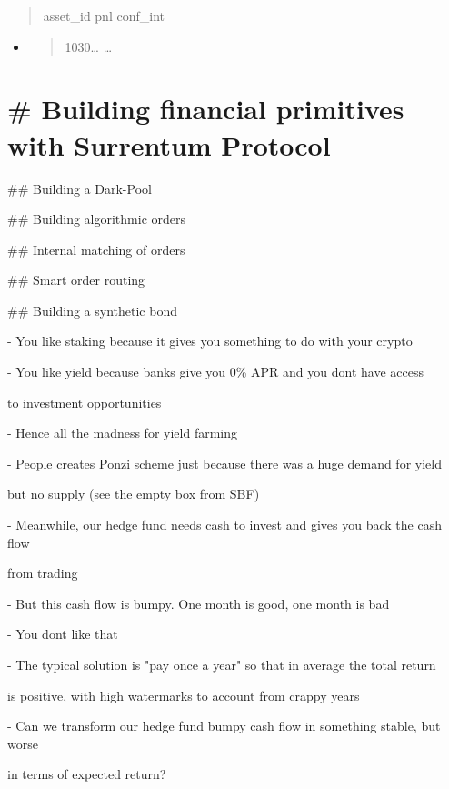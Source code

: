 \documentclass[11pt, reqno]{amsart}
\begin{document}
\begin{quote}
asset\_id pnl conf\_int
\end{quote}

\begin{itemize}
\item
  \begin{quote}
  1030\ldots{} \ldots{}
  \end{quote}
\end{itemize}

\hypertarget{building-financial-primitives-with-surrentum-protocol}{%
\section{\# Building financial primitives with Surrentum
Protocol}\label{building-financial-primitives-with-surrentum-protocol}}

\#\# Building a Dark-Pool

\#\# Building algorithmic orders

\#\# Internal matching of orders

\#\# Smart order routing

\#\# Building a synthetic bond

- You like staking because it gives you something to do with your crypto

- You like yield because banks give you 0\% APR and you
don\textquotesingle t have access

to investment opportunities

- Hence all the madness for yield farming

- People creates Ponzi scheme just because there was a huge demand for
yield

but no supply (see the empty box from SBF)

- Meanwhile, our hedge fund needs cash to invest and gives you back the
cash flow

from trading

- But this cash flow is bumpy. One month is good, one month is bad

- You don\textquotesingle t like that

- The typical solution is "pay once a year" so that in average the total
return

is positive, with high watermarks to account from crappy years

- Can we transform our hedge fund bumpy cash flow in something stable,
but worse

in terms of expected return?
\end{document}

